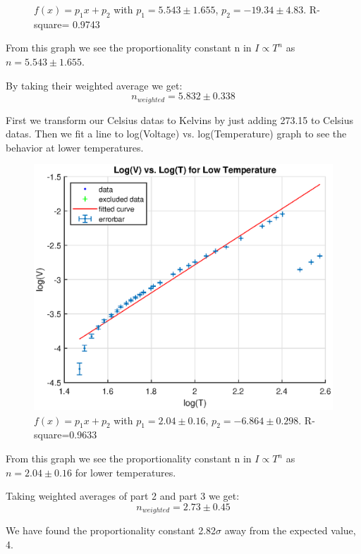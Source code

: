 \documentclass[10pt,a4paper]{article}
\begin{document}
{\begin{figure}[H]
\caption{$f(x) = p_1x+p_2$ with $p_1=5.543 \pm1.655$, $p_2=-19.34\pm4.83$. R-square= 0.9743}
\end{figure}
\par From this graph we see the proportionality constant n in $I\propto T^n$ as $n=5.543 \pm1.655$.
\par By taking their weighted average we get:
\begin{equation}
n_{weighted}=5.832\pm0.338
\end{equation}
\par First we transform our Celsius datas to Kelvins by just adding 273.15 to Celsius datas. Then we fit a line to log(Voltage) vs. log(Temperature) graph to see the behavior at lower temperatures.
\begin{figure}[H]
\advance{}
\includegraphics[scale=0.7]{lowtemp.eps}
\caption{$f(x) = p_1x+p_2$ with $p_1=2.04\pm0.16$, $p_2=-6.864\pm0.298$. R-square=0.9633}
\end{figure}
\par From this graph we see the proportionality constant n in $I\propto T^n$ as $n=2.04\pm0.16$ for lower temperatures.
\par Taking weighted averages of part 2 and part 3 we get:
\begin{equation}
n_{weighted}=2.73\pm0.45
\end{equation}
\par We have found the proportionality constant  2.82$\sigma$ away from the expected value, 4.
\\[\baselineskip]
}
\end{document}

